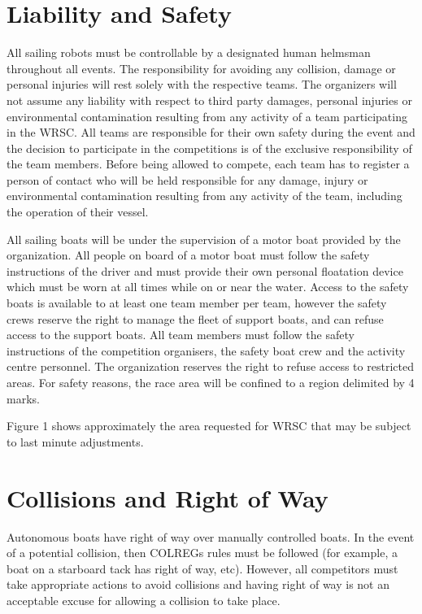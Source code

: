 \documentclass[12pt]{article}
\begin{document}
\section{Liability and Safety}
All sailing robots must be controllable by a designated human helmsman
throughout all events. The responsibility for avoiding any collision, 
damage or personal injuries will rest solely with the respective teams. 
The organizers will not assume any liability with respect to third party
damages, personal injuries or environmental contamination resulting from any
activity of a team participating in the WRSC. All teams are responsible for 
their own safety during the event and the decision to participate in the 
competitions is of the exclusive responsibility of the team members.
Before being allowed to compete, each team has to register a person of contact
who will be held responsible for any damage, injury or environmental
contamination resulting from any activity of the team, including the 
operation of their vessel.

All sailing boats will be under the supervision of a motor boat provided by the
organization.
All people on board of a motor boat must follow the safety instructions of the driver 
and must provide their own personal floatation device which must be worn at all times 
while on or near the water. Access to the safety boats is available to at least
one team member per team, however the safety crews reserve the
right to manage the fleet of support boats, and can refuse access to the support
boats.
All team members must follow the safety instructions of the competition
organisers, the safety boat crew and the activity centre personnel. The organization
reserves the right to refuse access to restricted areas.
For safety reasons, the race area will be confined to a region delimited by 4
marks. 

Figure 1
shows approximately the area requested for WRSC that may be subject to last
minute adjustments.


\section{Collisions and Right of Way}
Autonomous boats have right of way over manually controlled boats. In the event
of a potential
collision, then COLREGs rules must be followed (for example, a boat on a
starboard tack has
right of way, etc). However, all competitors must take appropriate actions to
avoid collisions
and having right of way is not an acceptable excuse for allowing a collision to
take place.
\end{document}
